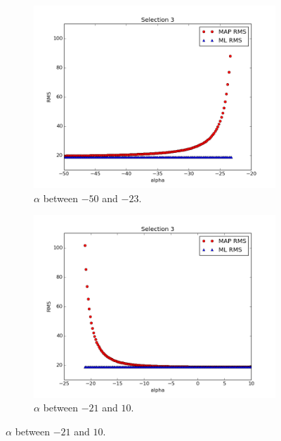 \documentclass[a4paper]{article}
\begin{document}
\begin{figure}[H]
  \begin{adjustwidth}{-7em}{-7em}
    \centering
    \begin{subfigure}{.32\linewidth}
      \includegraphics[width=\linewidth]{figures/alpha_vs_rms_selection3a.png}
      \caption{$\alpha$ between $-50$ and $-23$.}
      \label{fig:alpha_vs_rms_selection3a}
    \end{subfigure}
    \begin{subfigure}{.32\linewidth}
      \includegraphics[width=\linewidth]{figures/alpha_vs_rms_selection3b.png}
      \caption{$\alpha$ between $-21$ and $10$.}
      \label{fig:alpha_vs_rms_selection3b}
    \end{subfigure}

\end{adjustwidth}
\end{figure}
\end{document}
